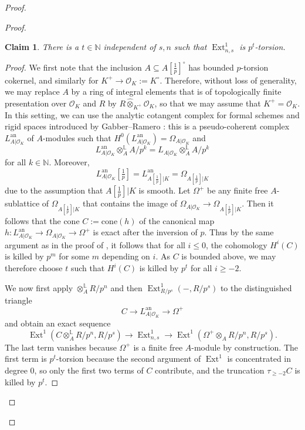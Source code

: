 \documentclass[11pt]{amsart}
\numberwithin{equation}{section}
\newtheorem{Claim}[thm]{Claim}
\theoremstyle{definition}
\theoremstyle{remark}
\newcommand{\lra}{\longrightarrow}
\newcommand{\N}{\mathbb{N}}
\renewcommand{\O}{\mathcal{O}}
\newcommand{\an}{{\mathrm{an}}}
\newcommand{\tf}{[\tfrac{1}{p}]}
\newcommand{\Ext}{\operatorname{Ext}}
\begin{document}
\begin{proof}
\begin{proof}
 		\begin{Claim}
 			There is a $t\in \N$ independent of $s,n$ such that $\Ext_{n,s}^1$ is $p^t$-torsion.
 		\end{Claim}

                \begin{proof}
 			We first note that the inclusion $A\subseteq A\tf^\circ$ has bounded $p$-torsion cokernel, and similarly for $K^+\to \O_K:=K^\circ$. Therefore, without loss of generality, we may replace $A$ by a ring of integral elements that is of topologically finite presentation over $\O_K$ and $R$ by $R\hat{\otimes}_{K^+}\O_K$, so that we  may assume that  $K^+=\O_K$.
 			In this setting, we can use the analytic cotangent complex for formal schemes and rigid spaces introduced by Gabber--Ramero \cite[Section~7]{GabberRamero}: this is a pseudo-coherent complex $L^{\an}_{ A|\O_K}$ of $A$-modules such that $H^0(L^{\an}_{ A|\O_K})=\Omega_{A|\O_K}$ and \[L^{\an}_{ A|\O_K}\otimes^{\mathbb L}_{A}A/p^k=L_{ A|\O_K}\otimes^{\mathbb L}_{A}A/p^k\]
 			for all $k\in \N$. Moreover, 
 			\[L^{\an}_{ A|\O_K}\tf=L^{\an}_{ A[\frac{1}{p}]|K}=\Omega_{A[\frac{1}{p}]|K}\]
 			due to the assumption that $A[\tfrac{1}{p}]|K$ is smooth. 
 			Let $\Omega^+$ be any finite free $A$-sublattice of $\Omega_{A[\frac{1}{p}]|K}$ that contains the image of $ \Omega_{A|\O_K}\to  \Omega_{A[\frac{1}{p}]|K}$. Then it follows that the cone $C:=\mathrm{cone}(h)$ of the canonical map $h\colon L^{\an}_{ A|\O_K}\to \Omega_{A|\O_K}\to \Omega^+$ is exact after the inversion of $p$. Thus by the same argument as in the proof of \cite[Proposition 6.10(iii)]{perfectoid-spaces}, it follows that for all $i\leq 0$, the cohomology $H^i(C)$ is killed by $p^m$ for some $m$ depending on $i$. As $C$ is bounded above, we may therefore choose $t$ such that $H^i(C)$ is killed by $p^t$ for all $i\geq -2$.
 			
 			We now first apply $\otimes^{\mathbb L}_{A}R/p^n$ and then $\Ext^1_{R/p^s}(-,R/p^s)$ to the distinguished triangle
 			\[ C\lra L^{\an}_{ A|\O_K}\lra \Omega^+\]
 			and obtain an exact sequence
 			\[ \Ext^1\left(C\otimes^{\mathbb L}_{A}R/p^n,R/p^s\right)\lra \Ext^1_{n,s}\lra \Ext^1\left(\Omega^+\otimes_{A}R/p^n,R/p^s\right).\]
 			The last term vanishes because $\Omega^+$ is a finite free $A$-module by construction.
 			The first term is $p^t$-torsion because the second argument of $\Ext^1$ is concentrated in degree $0$, so only the first two terms of $C$ contribute, and the truncation $\tau_{\geq -2}C$ is killed by $p^t$.
 		\end{proof}
                

\end{proof}
\end{proof}
\end{document}
